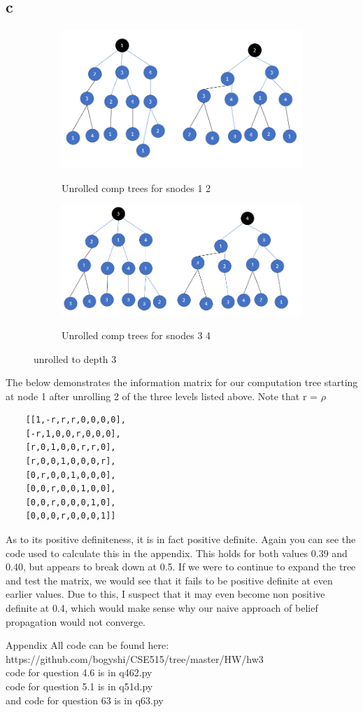 \documentclass[12pt]{article}
\begin{document}
\begin{section}{6.3}
	\subsection{c}
		\begin{figure}[H]
		\centering
		\begin{subfigure}{.5\textwidth}
			\centering
			\includegraphics[width=.8\linewidth]{comptree12.png}
			\label{63c1}
			\caption{Unrolled comp trees for snodes 1 2}
		\end{subfigure}%
		\begin{subfigure}{.5\textwidth}
			\centering
			\includegraphics[width=.8\linewidth]{comptree34.png}
			\label{63c2}
			\caption{Unrolled comp trees for snodes 3 4}
		\end{subfigure}
		\label{63c}
		\caption{unrolled to depth 3}
	\end{figure}
The below demonstrates the information matrix for our computation tree starting at node 1 after unrolling 2 of the three levels listed above. Note that r = $\rho$
\begin{verbatim}
	[[1,-r,r,r,0,0,0,0],
	[-r,1,0,0,r,0,0,0],
	[r,0,1,0,0,r,r,0],
	[r,0,0,1,0,0,0,r],
	[0,r,0,0,1,0,0,0],
	[0,0,r,0,0,1,0,0],
	[0,0,r,0,0,0,1,0],
	[0,0,0,r,0,0,0,1]]
\end{verbatim}
As to its positive definiteness, it is in fact positive definite. Again you can see the code used to calculate this in the appendix. This holds for both values 0.39 and 0.40, but appears to break down at 0.5. If we were to continue to expand the tree and test the matrix, we would see that it fails to be positive definite at even earlier values. Due to this, I suspect that it may even become non positive definite at 0.4, which would make sense why our naive approach of belief propagation would not converge.
\end{section}

\begin{section}{Appendix}
	All code can be found here: https://github.com/bogyshi/CSE515/tree/master/HW/hw3
	\\
	code for question 4.6 is in q462.py
	\\
	code for question 5.1 is in q51d.py
	\\
	and code for question 63 is in q63.py
\end{section}
\end{document}
